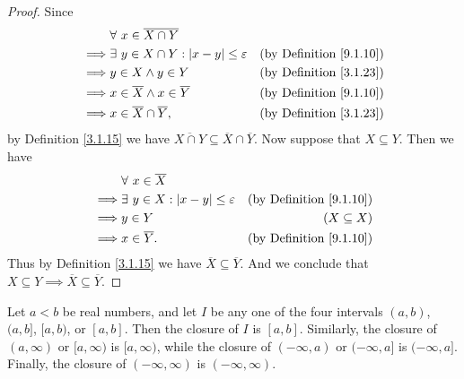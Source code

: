 \begin{proof}
    Since
    \begin{align*}
                 & \forall\ x \in \overline{X \cap Y}                                                            \\
        \implies & \exists\ y \in X \cap Y : \abs*{x - y} \leq \varepsilon & \text{(by Definition \ref{9.1.10})} \\
        \implies & y \in X \land y \in Y                                   & \text{(by Definition \ref{3.1.23})} \\
        \implies & x \in \overline{X} \land x \in \overline{Y}             & \text{(by Definition \ref{9.1.10})} \\
        \implies & x \in \overline{X} \cap \overline{Y},                   & \text{(by Definition \ref{3.1.23})}
    \end{align*}
    by Definition \ref{3.1.15} we have \(\overline{X \cap Y} \subseteq \overline{X} \cap \overline{Y}\).
    Now suppose that \(X \subseteq Y\).
    Then we have
    \begin{align*}
                 & \forall\ x \in \overline{X}                                                            \\
        \implies & \exists\ y \in X : \abs*{x - y} \leq \varepsilon & \text{(by Definition \ref{9.1.10})} \\
        \implies & y \in Y                                          & (X \subseteq X)                     \\
        \implies & x \in \overline{Y}.                              & \text{(by Definition \ref{9.1.10})}
    \end{align*}
    Thus by Definition \ref{3.1.15} we have \(\overline{X} \subseteq \overline{Y}\).
    And we conclude that \(X \subseteq Y \implies \overline{X} \subseteq \overline{Y}\).
\end{proof}

\begin{lemma}\label{9.1.12}
    Let \(a < b\) be real numbers, and let \(I\) be any one of the four intervals \((a, b)\), \((a, b]\), \([a, b)\), or \([a, b]\).
    Then the closure of \(I\) is \([a, b]\).
    Similarly, the closure of \((a, \infty)\) or \([a, \infty)\) is \([a, \infty)\), while the closure of \((-\infty, a)\) or \((-\infty, a]\) is \((-\infty, a]\).
    Finally, the closure of \((-\infty, \infty)\) is \((-\infty, \infty)\).
\end{lemma}


